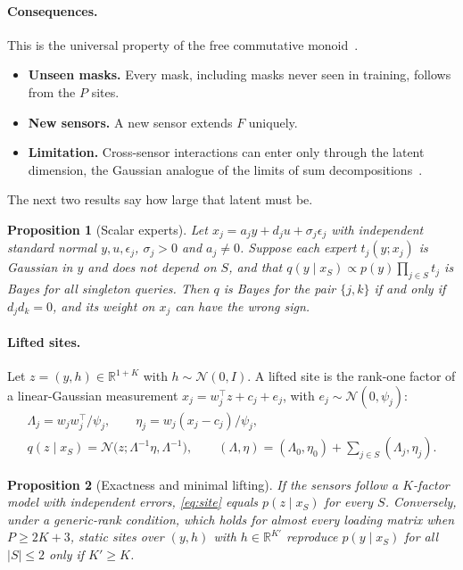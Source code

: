 \documentclass{article}
\newtheorem{proposition}{Proposition}
\newcommand{\R}{\mathbb{R}}
\newcommand{\N}{\mathcal{N}}
\begin{document}
\paragraph{Consequences.} This is the universal property of the free commutative monoid~\citep{maclane1998categories}.
\begin{itemize}
  \item \textbf{Unseen masks.} Every mask, including masks never seen in training, follows from the $P$ sites.
  \item \textbf{New sensors.} A new sensor extends $F$ uniquely.
  \item \textbf{Limitation.} Cross-sensor interactions can enter only through the latent dimension, the Gaussian analogue of
  the limits of sum decompositions~\citep{wagstaff2022universal}.
\end{itemize}

The next two results say how large that latent must be.

\begin{proposition}[Scalar experts]\label{prop:scalar}
Let $x_j=a_jy+d_ju+\sigma_j\epsilon_j$ with independent standard normal $y,u,\epsilon_j$, $\sigma_j>0$ and
$a_j\neq0$. Suppose each expert $t_j(y;x_j)$ is Gaussian in $y$ and does not depend on $S$, and that
$q(y\mid x_S)\propto p(y)\prod_{j\in S}t_j$ is Bayes for all singleton queries. Then $q$ is Bayes for the pair
$\{j,k\}$ if and only if $d_jd_k=0$, and its weight on $x_j$ can have the wrong sign.
\end{proposition}

\paragraph{Lifted sites.} Let $z=(y,h)\in\R^{1+K}$ with $h\sim\N(0,I)$. A lifted site is the rank-one factor of a
linear-Gaussian measurement $x_j=w_j^\top z+c_j+e_j$, with $e_j\sim\N(0,\psi_j)$:
\begin{equation}
  \begin{gathered}
  \Lambda_j=w_jw_j^\top/\psi_j,\qquad \eta_j=w_j(x_j-c_j)/\psi_j,\\
  q(z\mid x_S)=\N\big(z;\Lambda^{-1}\eta,\Lambda^{-1}\big),\qquad
  (\Lambda,\eta)=(\Lambda_0,\eta_0)+\textstyle\sum_{j\in S}(\Lambda_j,\eta_j).
  \end{gathered}
  \label{eq:site}
\end{equation}

\begin{proposition}[Exactness and minimal lifting]\label{prop:exact}\label{prop:rank}
If the sensors follow a $K$-factor model with independent errors, \eqref{eq:site} equals $p(z\mid x_S)$ for every $S$.
Conversely, under a generic-rank condition, which holds for almost every loading matrix when $P\geq2K+3$, static
sites over $(y,h)$ with $h\in\R^{K'}$ reproduce $p(y\mid x_S)$ for all $|S|\leq2$ only if $K'\geq K$.
\end{proposition}
\end{document}
